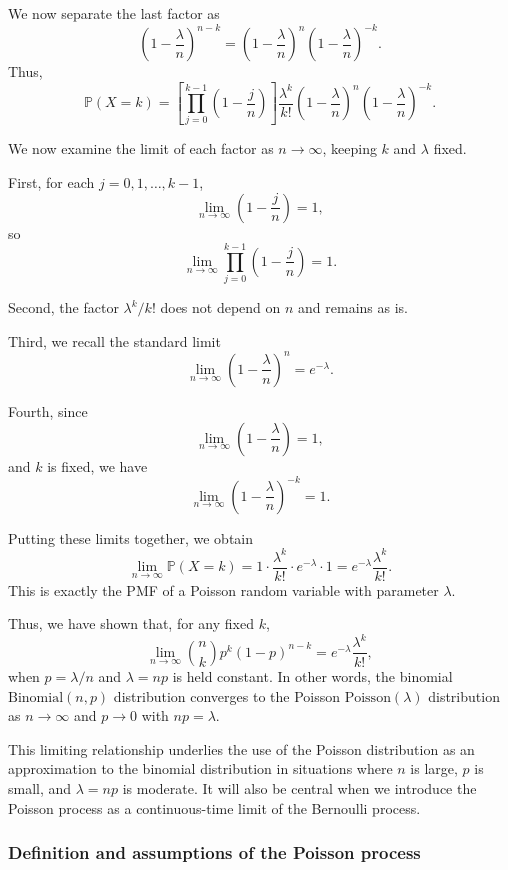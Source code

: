 We now separate the last factor as
\[
\left(1 - \frac{\lambda}{n}\right)^{n-k}
=
\left(1 - \frac{\lambda}{n}\right)^{n}
\left(1 - \frac{\lambda}{n}\right)^{-k}.
\]
Thus,
\[
\mathbb{P}(X = k)
=
\left[\prod_{j=0}^{k-1} \left(1 - \frac{j}{n}\right)\right]
\frac{\lambda^{k}}{k!}
\left(1 - \frac{\lambda}{n}\right)^{n}
\left(1 - \frac{\lambda}{n}\right)^{-k}.
\]

We now examine the limit of each factor as \(n \to \infty\), keeping \(k\) and \(\lambda\) fixed.  

First, for each \(j = 0,1,\ldots,k-1\),
\[
\lim_{n \to \infty} \left(1 - \frac{j}{n}\right) = 1,
\]
so
\[
\lim_{n \to \infty}
\prod_{j=0}^{k-1} \left(1 - \frac{j}{n}\right)
=
1.
\]

Second, the factor \(\lambda^{k}/k!\) does not depend on \(n\) and remains as is.  

Third, we recall the standard limit
\[
\lim_{n \to \infty}
\left(1 - \frac{\lambda}{n}\right)^{n}
=
e^{-\lambda}.
\]

Fourth, since
\[
\lim_{n \to \infty} \left(1 - \frac{\lambda}{n}\right) = 1,
\]
and \(k\) is fixed, we have
\[
\lim_{n \to \infty}
\left(1 - \frac{\lambda}{n}\right)^{-k}
=
1.
\]

Putting these limits together, we obtain
\[
\lim_{n \to \infty}
\mathbb{P}(X = k)
=
1 \cdot
\frac{\lambda^{k}}{k!} \cdot
e^{-\lambda} \cdot
1
=
e^{-\lambda} \frac{\lambda^{k}}{k!}.
\]
This is exactly the PMF of a Poisson random variable with parameter \(\lambda\).  

Thus, we have shown that, for any fixed \(k\),
\[
\lim_{n \to \infty}
\binom{n}{k} p^{k} (1-p)^{n-k}
=
e^{-\lambda} \frac{\lambda^{k}}{k!},
\]
when \(p = \lambda/n\) and \(\lambda = np\) is held constant.  
In other words, the binomial \(\text{Binomial}(n,p)\) distribution converges to the Poisson \(\text{Poisson}(\lambda)\) distribution as \(n \to \infty\) and \(p \to 0\) with \(np = \lambda\).  

This limiting relationship underlies the use of the Poisson distribution as an approximation to the binomial distribution in situations where \(n\) is large, \(p\) is small, and \(\lambda = np\) is moderate.  
It will also be central when we introduce the Poisson process as a continuous-time limit of the Bernoulli process.


\subsubsection{Definition and assumptions of the Poisson process}

